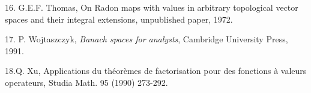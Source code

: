 \item{16.} G.E.F.  Thomas, On Radon maps with values in arbitrary
topological vector spaces and their integral extensions, unpublished
paper, 1972.
 
\item{17.} P. Wojtaszczyk, {\it Banach spaces for analysts}, Cambridge
University Press, 1991.
 
 
\item{18.}Q. Xu, Applications du th\'eor\`emes de factorisation pour des
fonctions \`a valeurs operateurs, Studia Math. 95 (1990) 273-292.
 
 
      \bye
 
 
 
 
 
 
 
 
 
 
 
 
 
 
 
 
 
 
 
 
 
 
 
 
 
 
 
 
 
 
 
 
 
 
 
 
 
 
 
 
 
 
 
 
 
 
 
 
 
 
 
 
 
 
 
 
 
 
 
 
 
 
 
 
 
 
 
 
 
 
 
 
 
 
 
 
